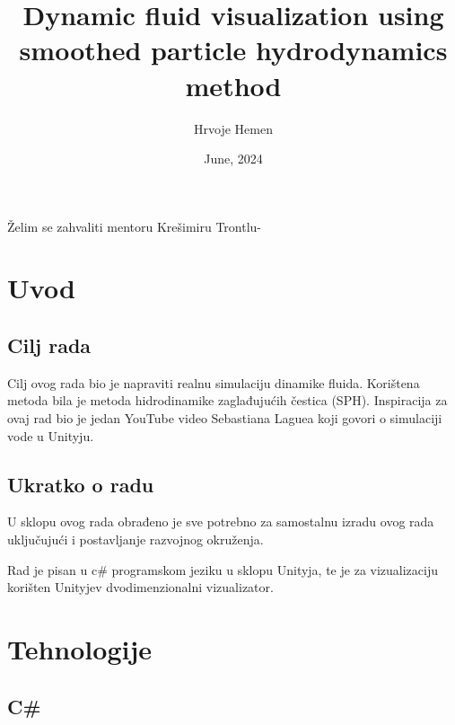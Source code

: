 \documentclass[diplomskirad]{fer}
\title{Dynamic fluid visualization using smoothed particle hydrodynamics method}
\author{Hrvoje Hemen}
\date{June, 2024}
\begin{document}
    \maketitle
    \begin{zahvale}
        Želim se zahvaliti mentoru Krešimiru Trontlu-
    \end{zahvale}
    \mainmatter
    \tableofcontents


    \chapter{Uvod}\label{ch:uvod}


    \section{Cilj rada}\label{sec:cilj-rada}

    Cilj ovog rada bio je napraviti realnu simulaciju dinamike fluida.
    Korištena metoda bila je metoda hidrodinamike zaglađujućih čestica (SPH).
    Inspiracija za ovaj rad bio je jedan YouTube video Sebastiana Laguea koji govori o simulaciji vode u Unityju.


    \section{Ukratko o radu}\label{sec:ukratko-o-radu}

    U sklopu ovog rada obrađeno je sve potrebno za samostalnu izradu ovog rada uključujući i postavljanje razvojnog okruženja.

    Rad je pisan u c\# programskom jeziku u sklopu Unityja, te je za vizualizaciju korišten Unityjev dvodimenzionalni vizualizator.


    \chapter{Tehnologije}\label{ch:tehnologije}


    \section{C\#}\label{sec:c}
\end{document}
